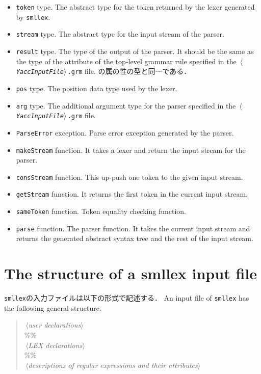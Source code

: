 \documentclass{jbook}
\newcommand{\txt}[2]{#2}
\newcommand{\code}[1]{\mbox{\large\tt #1}}
\newcommand{\nonterm}[1]{\mbox{$\,\langle$}{\it #1}\mbox{$\rangle\,$}}
\newenvironment{program}{\begin{quote}\begin{tt}}%
                        {\end{tt}\end{quote}}
\begin{document}
\begin{itemize}
\item \code{token} type.
	The abstract type for the token returned by the lexer generated
by \code{smllex}.
\item \code{stream} type.
	The abstract type for the input stream of the parser.
\item \code{result} type.
	The type of the output of the parser.
	It should be the same as the type of the attribute of the
top-level grammar rule specified in the
\code{\nonterm{YaccInputFile}.grm} file.
の属の性の型と同一である．
\item \code{pos} type.
	The position data type used by the lexer.
\item \code{arg} type.
	The additional argument type for the parser specified in the
\code{\nonterm{YaccInputFile}.grm} file.
\item \code{ParseError} exception.
	Parse error exception generated by the parser.
\item \code{makeStream} function.
	It takes a lexer and return the input stream for the parser.
\item \code{consStream} function.
	This up-push one token to the given input stream. 
\item \code{getStream} function.
	It returns the first token in the current input stream.
\item \code{sameToken} function.
	Token equality checking function.
\item \code{parse} function.
	The parser function.
	It takes the current input stream and returns the generated
abstract syntax tree and the rest of the input stream.
\end{itemize}	
\fi%

\section{\txt{smllex入力ファイルの構造}{The structure of a smllex input file}}
\ifjp%
	\code{smllex}の入力ファイルは以下の形式で記述する．
\else%
	An input file of \code{smllex} has the following general structure.
\fi%

\begin{program}
\nonterm{\txt{ユーザ定義}{user declarations}}
\\
\%\%
\\
\nonterm{\txt{字句解析のためのLEX宣言}{LEX declarations}}
\\
\%\% 
\\
\nonterm{\txt{正規表現とその属性の定義}{descriptions of regular expressions and their attributes}}
\end{program}
\end{document}
